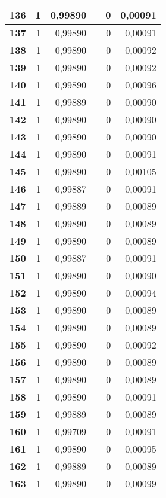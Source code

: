 \begin{longtable}{|r|r|r|l|r|r|}
\textbf{136} & 1 & 0,99890 &  & 0 & 0,00091 \\ \hline
\textbf{137} & 1 & 0,99890 &  & 0 & 0,00091 \\ \hline
\textbf{138} & 1 & 0,99890 &  & 0 & 0,00092 \\ \hline
\textbf{139} & 1 & 0,99890 &  & 0 & 0,00092 \\ \hline
\textbf{140} & 1 & 0,99890 &  & 0 & 0,00096 \\ \hline
\textbf{141} & 1 & 0,99889 &  & 0 & 0,00090 \\ \hline
\textbf{142} & 1 & 0,99890 &  & 0 & 0,00090 \\ \hline
\textbf{143} & 1 & 0,99890 &  & 0 & 0,00090 \\ \hline
\textbf{144} & 1 & 0,99890 &  & 0 & 0,00091 \\ \hline
\textbf{145} & 1 & 0,99890 &  & 0 & 0,00105 \\ \hline
\textbf{146} & 1 & 0,99887 &  & 0 & 0,00091 \\ \hline
\textbf{147} & 1 & 0,99889 &  & 0 & 0,00089 \\ \hline
\textbf{148} & 1 & 0,99890 &  & 0 & 0,00089 \\ \hline
\textbf{149} & 1 & 0,99890 &  & 0 & 0,00089 \\ \hline
\textbf{150} & 1 & 0,99887 &  & 0 & 0,00091 \\ \hline
\textbf{151} & 1 & 0,99890 &  & 0 & 0,00090 \\ \hline
\textbf{152} & 1 & 0,99890 &  & 0 & 0,00094 \\ \hline
\textbf{153} & 1 & 0,99890 &  & 0 & 0,00089 \\ \hline
\textbf{154} & 1 & 0,99890 &  & 0 & 0,00089 \\ \hline
\textbf{155} & 1 & 0,99890 &  & 0 & 0,00092 \\ \hline
\textbf{156} & 1 & 0,99890 &  & 0 & 0,00089 \\ \hline
\textbf{157} & 1 & 0,99890 &  & 0 & 0,00089 \\ \hline
\textbf{158} & 1 & 0,99890 &  & 0 & 0,00091 \\ \hline
\textbf{159} & 1 & 0,99889 &  & 0 & 0,00089 \\ \hline
\textbf{160} & 1 & 0,99709 &  & 0 & 0,00091 \\ \hline
\textbf{161} & 1 & 0,99890 &  & 0 & 0,00095 \\ \hline
\textbf{162} & 1 & 0,99889 &  & 0 & 0,00089 \\ \hline
\textbf{163} & 1 & 0,99890 &  & 0 & 0,00099 \\ \hline

\end{longtable}
